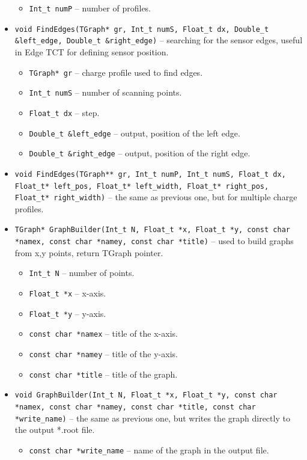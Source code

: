 \documentclass[12pt,oneside,notitlepage,abstracton,a4paper]{scrartcl}
\begin{document}
\begin{itemize}
\begin{itemize}
\item \lstinline$Int_t numP$ -- number of profiles.
\end{itemize}
\item \lstinline$void FindEdges(TGraph* gr, Int_t numS, Float_t dx, Double_t &left_edge, Double_t &right_edge)$ -- searching for the sensor edges, useful in Edge TCT for defining sensor position.
\begin{itemize}
\item \lstinline$TGraph* gr$ -- charge profile used to find edges.
\item \lstinline$Int_t numS$ -- number of scanning points.
\item \lstinline$Float_t dx$ -- step.
\item \lstinline$Double_t &left_edge$ --  output, position of the left edge.
\item \lstinline$Double_t &right_edge$ -- output, position of the right edge.
\end{itemize}
\item \lstinline$void FindEdges(TGraph** gr, Int_t numP, Int_t numS, Float_t dx, Float_t* left_pos, Float_t* left_width, Float_t* right_pos, Float_t* right_width)$ -- the same as previous one, but for multiple charge profiles.
\item \lstinline$TGraph* GraphBuilder(Int_t N, Float_t *x, Float_t *y, const char *namex, const char *namey, const char *title)$ -- used to build graphs from x,y points, return TGraph pointer. 
\begin{itemize}
\item \lstinline$Int_t N$ --  number of points.
\item \lstinline$Float_t *x$ -- x-axis.
\item \lstinline$Float_t *y$ -- y-axis.
\item \lstinline$const char *namex$ -- title of the x-axis.
\item \lstinline$const char *namey$ -- title of the y-axis.
\item \lstinline$const char *title$ -- title of the graph.
\end{itemize}
\item \lstinline$void GraphBuilder(Int_t N, Float_t *x, Float_t *y, const char *namex, const char *namey, const char *title, const char *write_name)$ -- the same as previous one, but writes the graph directly to the output *.root file.
\begin{itemize}
\item \lstinline$const char *write_name$ --  name of the graph in the output file.

\end{itemize}
\end{itemize}
\end{document}
